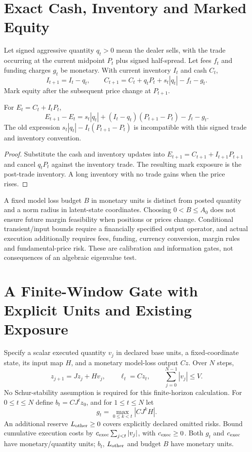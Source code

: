 \section{Exact Cash, Inventory and Marked Equity}
Let signed aggressive quantity $q_t>0$ mean the dealer sells, with the trade occurring at the current midpoint $P_t$ plus signed half-spread. Let fees $f_t$ and funding charges $g_t$ be monetary. With current inventory $I_t$ and cash $C_t$,
\[
I_{t+1}=I_t-q_t,\qquad
C_{t+1}=C_t+q_tP_t+s_t|q_t|-f_t-g_t.
\]
Mark equity after the subsequent price change at $P_{t+1}$.
\begin{proposition}
For $E_t=C_t+I_tP_t$,
\[
E_{t+1}-E_t=s_t|q_t|+(I_t-q_t)(P_{t+1}-P_t)-f_t-g_t.
\]
The old expression $s_t|q_t|-I_t(P_{t+1}-P_t)$ is incompatible with this signed trade and inventory convention.
\end{proposition}
\begin{proof}
Substitute the cash and inventory updates into $E_{t+1}=C_{t+1}+I_{t+1}P_{t+1}$ and cancel $q_tP_t$ against the inventory trade. The resulting mark exposure is the post-trade inventory. A long inventory with no trade gains when the price rises.
\end{proof}

A fixed model loss budget $B$ in monetary units is distinct from posted quantity and a norm radius in latent-state coordinates. Choosing $0<B\le A_0$ does not ensure future margin feasibility when positions or prices change. Conditional transient/input bounds require a financially specified output operator, and actual execution additionally requires fees, funding, currency conversion, margin rules and fundamental-price risk. These are calibration and information gates, not consequences of an algebraic eigenvalue test.



\section{A Finite-Window Gate with Explicit Units and Existing Exposure}
Specify a scalar executed quantity $v_j$ in declared base units, a fixed-coordinate state, its input map $H$, and a monetary model-loss output $Cz$. Over $N$ steps,
\[
z_{j+1}=Jz_j+Hv_j,\qquad \ell_t=Cz_t,\qquad
\sum_{j=0}^{N-1}|v_j|\le V.
\]
No Schur-stability assumption is required for this finite-horizon calculation. For $0\le t\le N$ define $b_t=CJ^tz_0$, and for $1\le t\le N$ let
\[
g_t=\max_{0\le k<t}|CJ^kH|.
\]
An additional reserve $L_{\rm other}\ge0$ covers explicitly declared omitted risks. Bound cumulative execution costs by $c_{\rm exec}\sum_{j<t}|v_j|$, with $c_{\rm exec}\ge0$. Both $g_t$ and $c_{\rm exec}$ have monetary/quantity units; $b_t$, $L_{\rm other}$ and budget $B$ have monetary units.

